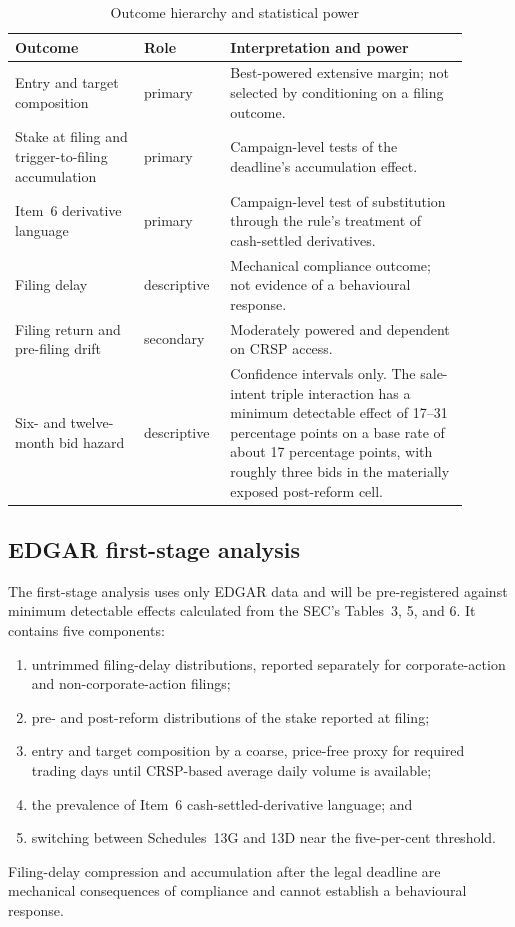 \begin{table}[htbp]
\centering
\small
\caption{Outcome hierarchy and statistical power}
\label{tab:outcome-hierarchy}
\begin{tabular}{@{}p{0.26\linewidth}p{0.16\linewidth}p{0.48\linewidth}@{}}
\toprule
Outcome & Role & Interpretation and power \\
\midrule
Entry and target composition & primary & Best-powered extensive margin; not
selected by conditioning on a filing outcome. \\
Stake at filing and trigger-to-filing accumulation & primary & Campaign-level
tests of the deadline's accumulation effect. \\
Item~6 derivative language & primary & Campaign-level test of substitution
through the rule's treatment of cash-settled derivatives. \\
Filing delay & descriptive & Mechanical compliance outcome; not evidence of a
behavioural response. \\
Filing return and pre-filing drift & secondary & Moderately powered and dependent
on CRSP access. \\
Six- and twelve-month bid hazard & descriptive & Confidence intervals only. The
sale-intent triple interaction has a minimum detectable effect of 17--31
percentage points on a base rate of about 17 percentage points, with roughly
three bids in the materially exposed post-reform cell. \\
\bottomrule
\end{tabular}
\end{table}

\subsection{EDGAR first-stage analysis}
\label{sec:first-stage}

The first-stage analysis uses only EDGAR data and will be pre-registered against
minimum detectable effects calculated from the SEC's Tables~3, 5, and 6. It
contains five components:
\begin{enumerate}
\item untrimmed filing-delay distributions, reported separately for
corporate-action and non-corporate-action filings;
\item pre- and post-reform distributions of the stake reported at filing;
\item entry and target composition by a coarse, price-free proxy for required
trading days until CRSP-based average daily volume is available;
\item the prevalence of Item~6 cash-settled-derivative language; and
\item switching between Schedules~13G and 13D near the five-per-cent threshold.
\end{enumerate}
Filing-delay compression and accumulation after the legal deadline are
mechanical consequences of compliance and cannot establish a behavioural
response.

